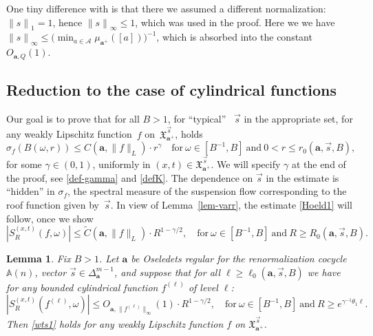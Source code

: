 \documentclass[JEP,XML,SOM,Unicode]{cedram}
\let\mathcal\mathscr
\theoremstyle{plain}
\newtheorem{lemma}[theorem]{Lemma}
\theoremstyle{definition}
\let\wt\widetilde
\newcommand\bom{{\boldsymbol a}}\let\ba\bom
\let\gam\gamma
\let\om\omega
\let\sig\sigma
\newcommand\Xx{\mathfrak{X}}
\newcommand\Ak{\mathcal{A}}
\newcommand\Aa{\mathbb{A}}
\newcommand\be{\begin{equation}}
\newcommand\ee{\end{equation}}
\begin{document}
One tiny difference with \cite[Prop.\,7.1]{BuSo18a} is that there we assumed a different normalization: ${\|s\|}_1=1$, hence ${\|s\|}_\infty\le 1$, which was used in the proof. Here we we have
${\|s\|}_\infty \le \bigl(\min_{a\in \Ak} \mu_{\bom^+}([a])\bigr)^{-1}$, which is absorbed into the constant $O_{\bom,Q}(1)$.

\subsection{Reduction to the case of cylindrical functions} \label{sec-reduc2}
Our goal is to prove that for all $B>1$, for ``typical'' \ $\vec{s}$ in the appropriate set, for any weakly Lipschitz function~$f$ on~$\Xx_{\bom^+}^{\vec{s}}$, holds
\be \label{Hoeld1}
\sig_f(B(\om,r)) \le C(\bom,\|f\|_L)\cdot r^\gam\quad \text{for}\ \om\in [B^{-1},B]\ \text{and}
\ 0 < r \le r_0(\bom,\vec{s}, B),
\ee
for some $\gam\in (0,1)$, uniformly in $(x,t)\in \Xx_{\bom^+}^{\vec{s}}$. We will specify $\gam$ at the end of the proof, see \eqref{def-gamma} and \eqref{defK}.
The dependence on $\vec{s}$ in the estimate is ``hidden'' in $\sig_f$, the spectral measure of the suspension flow corresponding to the roof function given by~$\vec{s}$.
In view of Lemma~\ref{lem-varr}, the estimate \eqref{Hoeld1} will follow, once we show
\be \label{wts1}
|S^{(x,t)}_R(f,\om)| \le \wt{C}(\bom,\|f\|_L)\cdot R^{1-\gam/2},\quad \text{for}\ \om\in [B^{-1},B]\ \text{and}\ R\ge R_0(\bom,\vec s, B).
\ee

\begin{lemma} \label{lem-reduc2}
Fix $B>1$. Let $\bom$ be Oseledets regular for the renormalization cocycle $\Aa(n)$, vector $\vec s\in \Delta_\bom^{m-1}$, and suppose that for all $\ell\ge \ell_0(\bom,\vec s,B)$ we have
for any bounded cylindrical function $f^{(\ell)}$ of level $\ell$:
\be \label{eq-wts111}
|S^{(x,t)}_R(f^{(\ell)},\om)| \le O_{\bom,\|f^{(\ell)}\|_\infty}(1)\cdot R^{1-\gam/2},\quad \text{for}\ \om\in [B^{-1},B]\ \text{and}\ R\ge e^{\gam^{-1}\theta_1 \ell}.
\ee
Then \eqref{wts1} holds for any weakly Lipschitz function $f$ on $\Xx_{\bom^+}^{\vec{s}}$.
\end{lemma}
\end{document}
